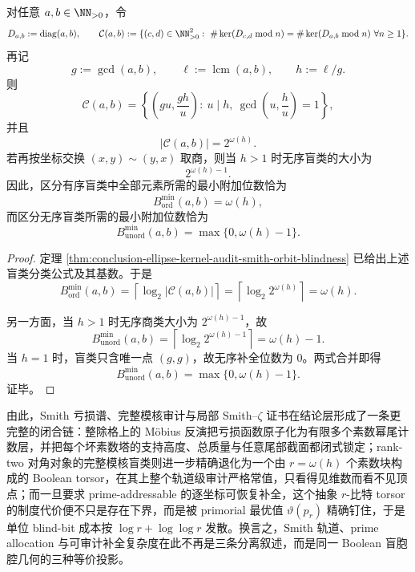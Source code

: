 \begin{corollary}\label{cor:conclusion-ranktwo-kernel-audit-boolean-blindclass-bits}
对任意 \(a,b\in\NN_{>0}\)，令
\[
D_{a,b}:=\operatorname{diag}(a,b),
\qquad
\mathcal C(a,b)
:=
\{(c,d)\in\NN_{>0}^2:\ \#\ker(D_{c,d}\bmod n)=\#\ker(D_{a,b}\bmod n)\ \forall n\ge 1\}.
\]
再记
\[
g:=\gcd(a,b),
\qquad
\ell:=\operatorname{lcm}(a,b),
\qquad
h:=\ell/g.
\]
则
\[
\mathcal C(a,b)=
\left\{
\left(gu,\frac{gh}{u}\right):
\ u\mid h,\ \gcd\!\left(u,\frac{h}{u}\right)=1
\right\},
\]
并且
\[
|\mathcal C(a,b)|=2^{\omega(h)}.
\]
若再按坐标交换 \((x,y)\sim(y,x)\) 取商，则当 \(h>1\) 时无序盲类的大小为
\[
2^{\omega(h)-1}.
\]
因此，区分有序盲类中全部元素所需的最小附加位数恰为
\[
\boxed{\;
B_{\mathrm{ord}}^{\min}(a,b)=\omega(h),\;}
\]
而区分无序盲类所需的最小附加位数恰为
\[
\boxed{\;
B_{\mathrm{unord}}^{\min}(a,b)=\max\{0,\omega(h)-1\}.\;}
\]
\end{corollary}
\begin{proof}
定理 \ref{thm:conclusion-ellipse-kernel-audit-smith-orbit-blindness} 已给出上述盲类分类公式及其基数。于是
\[
B_{\mathrm{ord}}^{\min}(a,b)
=
\left\lceil \log_2 |\mathcal C(a,b)|\right\rceil
=
\left\lceil \log_2 2^{\omega(h)}\right\rceil
=
\omega(h).
\]

另一方面，当 \(h>1\) 时无序商类大小为 \(2^{\omega(h)-1}\)，故
\[
B_{\mathrm{unord}}^{\min}(a,b)
=
\left\lceil \log_2 2^{\omega(h)-1}\right\rceil
=
\omega(h)-1.
\]
当 \(h=1\) 时，盲类只含唯一点 \((g,g)\)，故无序补全位数为 \(0\)。两式合并即得
\[
B_{\mathrm{unord}}^{\min}(a,b)=\max\{0,\omega(h)-1\}.
\]
证毕。
\end{proof}



\noindent
由此，Smith 亏损谱、完整模核审计与局部 Smith--\(\zeta\) 证书在结论层形成了一条更完整的闭合链：整除格上的 Möbius 反演把亏损函数原子化为有限多个素数幂尾计数层，并把每个坏素数塔的支持高度、总质量与任意尾部截面都闭式锁定；rank-two 对角对象的完整模核盲类则进一步精确退化为一个由 \(r=\omega(h)\) 个素数块构成的 Boolean torsor，在其上整个轨道级审计严格常值，只看得见维数而看不见顶点；而一旦要求 prime-addressable 的逐坐标可恢复补全，这个抽象 \(r\)-比特 torsor 的制度代价便不只是存在下界，而是被 primorial 最优值 \(\vartheta(p_r)\) 精确钉住，于是单位 blind-bit 成本按 \(\log r+\log\log r\) 发散。换言之，Smith 轨道、prime allocation 与可审计补全复杂度在此不再是三条分离叙述，而是同一 Boolean 盲胞腔几何的三种等价投影。

\endinput
